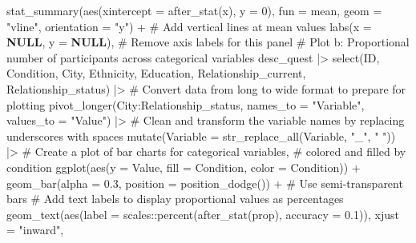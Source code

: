\documentclass[
  bookmarksnumbered]{article}
\newenvironment{Shaded}{\begin{snugshade}}{\end{snugshade}}
\newcommand{\AttributeTok}[1]{\textcolor[rgb]{0.80,0.80,0.80}{#1}}
\newcommand{\CommentTok}[1]{\textcolor[rgb]{0.50,0.62,0.50}{#1}}
\newcommand{\ConstantTok}[1]{\textcolor[rgb]{0.86,0.64,0.64}{\textbf{#1}}}
\newcommand{\DecValTok}[1]{\textcolor[rgb]{0.86,0.86,0.80}{#1}}
\newcommand{\FloatTok}[1]{\textcolor[rgb]{0.75,0.75,0.82}{#1}}
\newcommand{\FunctionTok}[1]{\textcolor[rgb]{0.94,0.94,0.56}{#1}}
\newcommand{\NormalTok}[1]{\textcolor[rgb]{0.80,0.80,0.80}{#1}}
\newcommand{\SpecialCharTok}[1]{\textcolor[rgb]{0.86,0.64,0.64}{#1}}
\newcommand{\StringTok}[1]{\textcolor[rgb]{0.80,0.58,0.58}{#1}}
\begin{document}
\begin{Shaded}
\begin{Highlighting}[]
    \FunctionTok{stat\_summary}\NormalTok{(}\FunctionTok{aes}\NormalTok{(}\AttributeTok{xintercept =} \FunctionTok{after\_stat}\NormalTok{(x), }\AttributeTok{y =} \DecValTok{0}\NormalTok{),}
                  \AttributeTok{fun =}\NormalTok{ mean, }\AttributeTok{geom =} \StringTok{"vline"}\NormalTok{, }\AttributeTok{orientation =} \StringTok{"y"}\NormalTok{) }\SpecialCharTok{+}  \CommentTok{\# Add vertical lines at mean values}
    \FunctionTok{labs}\NormalTok{(}\AttributeTok{x =} \ConstantTok{NULL}\NormalTok{, }\AttributeTok{y =} \ConstantTok{NULL}\NormalTok{),  }\CommentTok{\# Remove axis labels for this panel}
  \CommentTok{\# Plot b: Proportional number of participants across categorical variables}
\NormalTok{  desc\_quest }\SpecialCharTok{|\textgreater{}} 
    \FunctionTok{select}\NormalTok{(ID, Condition, City, Ethnicity, }
\NormalTok{           Education, Relationship\_current, Relationship\_status) }\SpecialCharTok{|\textgreater{}} 
    \CommentTok{\# Convert data from long to wide format to prepare for plotting}
    \FunctionTok{pivot\_longer}\NormalTok{(City}\SpecialCharTok{:}\NormalTok{Relationship\_status,}
                  \AttributeTok{names\_to =} \StringTok{"Variable"}\NormalTok{,}
                  \AttributeTok{values\_to =} \StringTok{"Value"}\NormalTok{) }\SpecialCharTok{|\textgreater{}} 
    \CommentTok{\# Clean and transform the variable names by replacing underscores with spaces}
    \FunctionTok{mutate}\NormalTok{(}\AttributeTok{Variable =} \FunctionTok{str\_replace\_all}\NormalTok{(Variable, }\StringTok{"\_"}\NormalTok{, }\StringTok{" "}\NormalTok{)) }\SpecialCharTok{|\textgreater{}} 
    \CommentTok{\# Create a plot of bar charts for categorical variables, }
    \CommentTok{\# colored and filled by condition}
    \FunctionTok{ggplot}\NormalTok{(}\FunctionTok{aes}\NormalTok{(}\AttributeTok{y =}\NormalTok{ Value, }\AttributeTok{fill =}\NormalTok{ Condition, }\AttributeTok{color =}\NormalTok{ Condition)) }\SpecialCharTok{+}
    \FunctionTok{geom\_bar}\NormalTok{(}\AttributeTok{alpha =} \FloatTok{0.3}\NormalTok{, }\AttributeTok{position =} \FunctionTok{position\_dodge}\NormalTok{()) }\SpecialCharTok{+}  \CommentTok{\# Use semi{-}transparent bars}
    \CommentTok{\# Add text labels to display proportional values as percentages}
    \FunctionTok{geom\_text}\NormalTok{(}\FunctionTok{aes}\NormalTok{(}\AttributeTok{label =}\NormalTok{ scales}\SpecialCharTok{::}\FunctionTok{percent}\NormalTok{(}\FunctionTok{after\_stat}\NormalTok{(prop), }\AttributeTok{accuracy =} \FloatTok{0.1}\NormalTok{)),}
                \AttributeTok{xjust =} \StringTok{"inward"}\NormalTok{,}

\end{Highlighting}
\end{Shaded}
\end{document}
